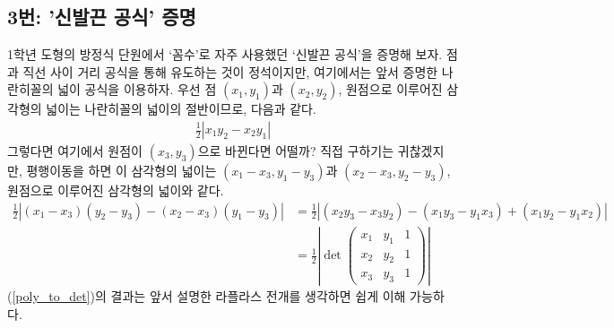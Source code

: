 \subsection{3번: '신발끈 공식' 증명}
1학년 도형의 방정식 단원에서 `꼼수'로 자주 사용했던 `신발끈 공식'을 증명해 보자. 점과 직선 사이 거리 공식을 통해 유도하는 것이 정석이지만, 여기에서는 앞서 증명한 나란히꼴의 넓이 공식을 이용하자. 우선 점 $(x_1, y_1)$과 $(x_2, y_2)$, 원점으로 이루어진 삼각형의 넓이는 나란히꼴의 넓이의 절반이므로, 다음과 같다.
\begin{align*}
\frac{1}{2}|x_1y_2-x_2y_1|
\end{align*}
그렇다면 여기에서 원점이 $(x_3, y_3)$으로 바뀐다면 어떨까? 직접 구하기는 귀찮겠지만, 평행이동을 하면 이 삼각형의 넓이는 $(x_1-x_3, y_1-y_3)$과 $(x_2-x_3, y_2-y_3)$, 원점으로 이루어진 삼각형의 넓이와 같다.
\begin{align}
\frac{1}{2}|(x_1-x_3)(y_2-y_3)-(x_2-x_3)(y_1-y_3)|&=\frac{1}{2}|(x_2y_3-x_3y_2)-(x_1y_3-y_1x_3)+(x_1y_2-y_1x_2)| \nonumber\\
\label{poly_to_det}&=\frac{1}{2}\left|\det\begin{pmatrix}
x_1 & y_1 & 1\\
x_2 & y_2 & 1\\
x_3 & y_3 & 1
\end{pmatrix}\right|
\end{align}
(\ref{poly_to_det})의 결과는 앞서 설명한 라플라스 전개를 생각하면 쉽게 이해 가능하다. 
